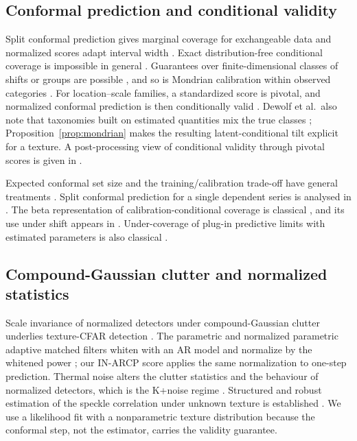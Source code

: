 \documentclass[nolineno]{ieeeaccess}
\begin{document}
\subsection{Conformal prediction and conditional validity}
Split conformal prediction gives marginal coverage for exchangeable data and normalized scores adapt interval width \cite{lei2018}. Exact distribution-free conditional coverage is impossible in general \cite{barber2021limits}. Guarantees over finite-dimensional classes of shifts or groups are possible \cite{gibbs2025}, and so is Mondrian calibration within observed categories \cite{vovk2012,bostrom2020}. For location--scale families, a standardized score is pivotal, and normalized conformal prediction is then conditionally valid \cite{dewolf2025}. Dewolf et al.\ also note that taxonomies built on estimated quantities mix the true classes \cite{dewolf2025}; Proposition~\ref{prop:mondrian} makes the resulting latent-conditional tilt explicit for a texture. A post-processing view of conditional validity through pivotal scores is given in \cite{laplante2026}.

Expected conformal set size and the training/calibration trade-off have general treatments \cite{dhillon2024,das2026,yao2026}. Split conformal prediction for a single dependent series is analysed in \cite{barber2026,zhai2026}. The beta representation of calibration-conditional coverage is classical \cite{vovk2012}, and its use under shift appears in \cite{ramos2026}. Under-coverage of plug-in predictive limits with estimated parameters is also classical \cite{barndorff1996,lawless2005,vidoni2009}.

\subsection{Compound-Gaussian clutter and normalized statistics}
Scale invariance of normalized detectors under compound-Gaussian clutter underlies texture-CFAR detection \cite{conte1995,kraut1999,ollila2012}. The parametric and normalized parametric adaptive matched filters whiten with an AR model and normalize by the whitened power \cite{roman2000,michels2000}; our IN-ARCP score applies the same normalization to one-step prediction. Thermal noise alters the clutter statistics and the behaviour of normalized detectors, which is the K+noise regime \cite{watts1987,ward2013}. Structured and robust estimation of the speckle correlation under unknown texture is established \cite{tyler1987,hallin2006}. We use a likelihood fit with a nonparametric texture distribution because the conformal step, not the estimator, carries the validity guarantee.
\end{document}
